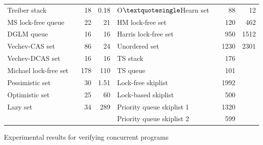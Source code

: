 \begin{figure}[]
\begin{tabular}{|l | r| r | l | r | r |}
\textsf{Treiber stack  ~\cite{Treiber:stack}} & \textsf {18} & \textsf {0.18} & \textsf {O$\textquotesingle $Hearn set  ~\cite{OHearnlist}} & \textsf{88} & \textsf{12} \\
\textsf{MS lock-free queue  ~\cite{MS:QueueAlgorithms}}& \textsf{22} & \textsf {21} & \textsf{HM lock-free set  ~\cite{ArtOfMpP} } & \textsf{120} & \textsf{462} \\
\textsf{DGLM queue  ~\cite{Doherty:lockfree}}&  \textsf {16} & \textsf{16} & \textsf{Harris lock-free set  ~\cite{Harris:list}} & \textsf{950} & \textsf {1512} \\
\textsf{Vechev-CAS set  ~\cite{Vechev:list}}  & \textsf{86} & \textsf {24} & \textsf{Unordered set  ~\cite{Zhang:unorderedlist}} & \textsf{1230} & \textsf {2301} \\
\cline{4-5}
\textsf{Vechev-DCAS set  ~\cite{Vechev:list}}   & \textsf{16} & \textsf{16} & \textsf{TS stack  ~\cite{ts-stack}}  & \textsf{176} &\\
\textsf{Michael lock-free set ~\cite{Michael:list}}  & \textsf{178} & \textsf{110} & \textsf{TS queue  ~\cite{ts-stack}} & \textsf{101} &\\
\cline{4-5}
\textsf{Pessimistic set  ~\cite{ArtOfMpP}}&\textsf{30} & \textsf{1.51} & \textsf{Lock-free skiplist   ~\cite{ArtOfMpP}}& \textsf{1992} & \\
\textsf{Optimistic set ~\cite{ArtOfMpP}}& \textsf{25} & \textsf{60} & \textsf{Lock-based skiplist ~\cite{lockskiplist}}& \textsf{500} & \\
\textsf{Lazy set ~\cite{Lazyset}}  & \textsf {34} & \textsf{289} & \textsf{Priority queue skiplist 1 ~\cite{Shavit:ElimQueue}} &\textsf{1320} & \\
& & &\textsf{Priority queue skiplist 2~\cite{Linden:opodis13}}  &  \textsf{599} &\\
\hline
\end{tabular}

\caption{Experimental results for verifying concurrent programs}
\label{Experiments:fig}
\end{figure}
